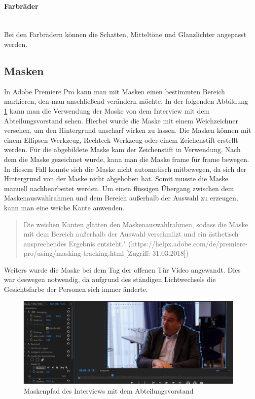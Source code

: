 \paragraph{Farbräder}
\leavevmode \\
Bei den Farbrädern können die Schatten, Mitteltöne und Glanzlichter angepasst werden.\citep{farbkorrektur}
\subsection{Masken}
In Adobe Premiere Pro kann man mit Masken einen bestimmten Bereich markieren, den man anschließend verändern möchte. In der folgenden Abbildung \ref{fig:abb28} kann man die Verwendung der Maske von dem Interview mit dem Abteilungsvorstand sehen. 
Hierbei wurde die Maske mit einem Weichzeichner versehen, um den Hintergrund unscharf wirken zu lassen. Die Masken können mit einem Ellipsen-Werkzeug, Rechteck-Werkzeug oder einem Zeichenstift erstellt werden. Für die abgebildete Maske kam der Zeichenstift in Verwendung. Nach dem die Maske gezeichnet wurde, kann man die Maske frame für frame bewegen. In diesem Fall konnte sich die Maske nicht automatisch mitbewegen, da sich der Hintergrund von der Maske nicht abgehoben hat. Somit musste die Maske manuell nachbearbeitet werden.\newline
Um einen flüssigen Übergang zwischen dem Maskenauswahlrahmen und dem Bereich außerhalb der Auswahl zu erzeugen, kann man eine weiche Kante anwenden.\citep{masken}\begin{quote}Die weichen Kanten glätten den Maskenauswahlrahmen, sodass die Maske mit dem Bereich außerhalb der Auswahl verschmilzt und ein ästhetisch ansprechendes Ergebnis entsteht." (https://helpx.adobe.com/de/premiere-pro/using/masking-tracking.html [Zugriff: 31.03.2018])\end{quote}
Weiters wurde die Maske bei dem Tag der offenen Tür Video angewandt. Dies war deswegen notwendig, da aufgrund des ständigen Lichtwechsels die Gesichtsfarbe der Personen sich immer änderte. 
\begin{figure}[H]
	\centering
	\includegraphics[width=1.0\textwidth]{abb28} 
	\caption{Maskenpfad des Interviews mit dem Abteilungsvorstand}\label{fig:abb28}
\end{figure}
